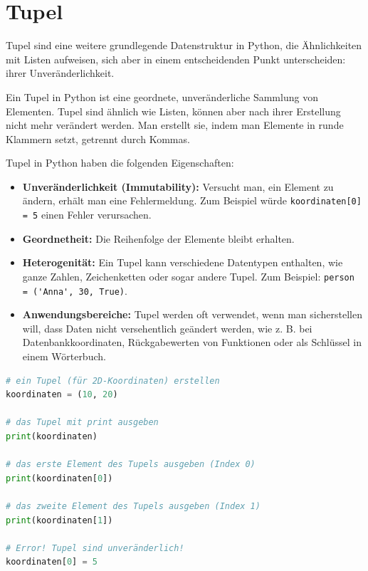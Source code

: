 \section{Tupel}
Tupel sind eine weitere grundlegende Datenstruktur in Python, die Ähnlichkeiten mit Listen aufweisen, sich aber in einem entscheidenden Punkt unterscheiden: ihrer Unveränderlichkeit.

\begin{mydefinition}
Ein Tupel in Python ist eine geordnete, unveränderliche Sammlung von Elementen.
Tupel sind ähnlich wie Listen, können aber nach ihrer Erstellung nicht mehr verändert werden.
Man erstellt sie, indem man Elemente in runde Klammern setzt, getrennt durch Kommas.
\end{mydefinition}

Tupel in Python haben die folgenden Eigenschaften:
\begin{itemize}
	\item \textbf{Unveränderlichkeit (Immutability):} Versucht man, ein Element zu ändern, erhält man eine Fehlermeldung. Zum Beispiel würde \lstinline|koordinaten[0] = 5| einen Fehler verursachen.
	\item \textbf{Geordnetheit:} Die Reihenfolge der Elemente bleibt erhalten.
	\item \textbf{Heterogenität:} Ein Tupel kann verschiedene Datentypen enthalten, wie ganze Zahlen, Zeichenketten oder sogar andere Tupel. Zum Beispiel: \lstinline|person = ('Anna', 30, True)|.
	\item \textbf{Anwendungsbereiche:} Tupel werden oft verwendet, wenn man sicherstellen will, dass Daten nicht versehentlich geändert werden, wie z. B. bei Datenbankkoordinaten, Rückgabewerten von Funktionen oder als Schlüssel in einem Wörterbuch.
\end{itemize}

\begin{myexample}
\leavevmode
\begin{lstlisting}[language=Python]
# ein Tupel (für 2D-Koordinaten) erstellen
koordinaten = (10, 20)

# das Tupel mit print ausgeben
print(koordinaten)

# das erste Element des Tupels ausgeben (Index 0)
print(koordinaten[0])

# das zweite Element des Tupels ausgeben (Index 1)
print(koordinaten[1])

# Error! Tupel sind unveränderlich!
koordinaten[0] = 5
\end{lstlisting}
\end{myexample}

